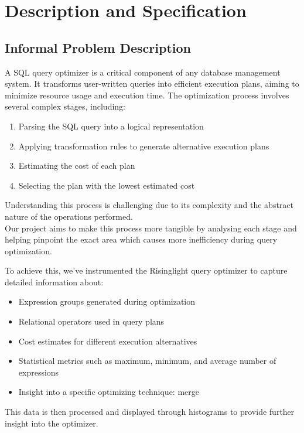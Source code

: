 \documentclass[a4paper,12pt]{scrreprt}
\begin{document}
\chapter{Description and Specification}\label{chap:analiseEspecificacao}
\thispagestyle{fancy}
\section{Informal Problem Description}\label{sec:descricaoProblema}

A SQL query optimizer is a critical component of any database management system. It transforms user-written queries into efficient execution plans, aiming to minimize resource usage and execution time. The optimization process involves several complex stages, including:
\begin{enumerate}
    \item Parsing the SQL query into a logical representation
    \item Applying transformation rules to generate alternative execution plans
    \item Estimating the cost of each plan
    \item Selecting the plan with the lowest estimated cost
\end{enumerate}

Understanding this process is challenging due to its complexity and the abstract nature of the operations performed. \\
Our project aims to make this process more tangible by analysing each stage and helping pinpoint the exact area which causes more inefficiency during query optimization.

To achieve this, we've instrumented the Risinglight query optimizer to capture detailed information about:
\begin{itemize}
    \item Expression groups generated during optimization
    \item Relational operators used in query plans
    \item Cost estimates for different execution alternatives
    \item Statistical metrics such as maximum, minimum, and average number of expressions
    \item Insight into a specific optimizing technique: merge
\end{itemize}

This data is then processed and displayed through histograms to provide further insight into the optimizer.
\end{document}
